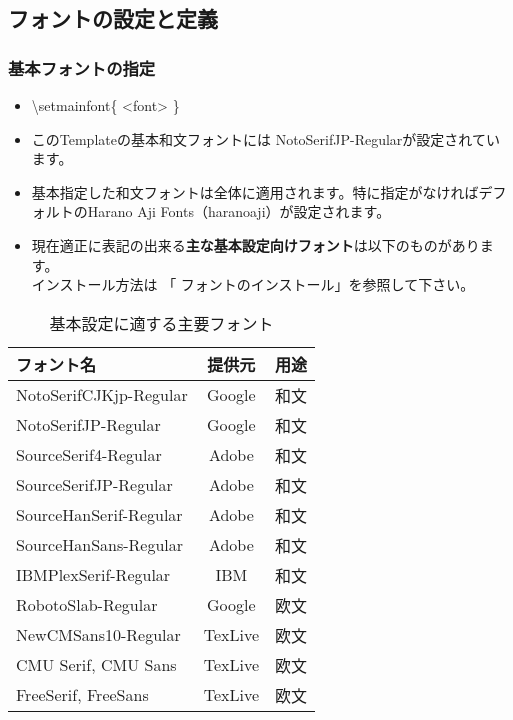 \documentclass[a4paper,10pt]{ltjsarticle}
\def\colH#1{\color[HTML]{#1}}
\def\bs{\textbackslash }
\begin{document}
\subsection{フォントの設定と定義}

\subsubsection{基本フォントの指定}
\begin{itemize}
  \item[]\hspace{-5mm} {\colH{800000}\bs setmainfont\{ <font> \}}
  \item このTemplateの基本和文フォントには{\colH{800000} NotoSerifJP-Regular}が設定されています。
  \item 基本指定した和文フォントは全体に適用されます。特に指定がなければデフォルトのHarano Aji Fonts（haranoaji）が設定されます。
  \item 現在適正に表記の出来る\textbf{主な基本設定向けフォント}は以下のものがあります。\\
  インストール方法は 「{\fFSans{} フォントのインストール}」を参照して下さい。\vspace{-4mm}
\end{itemize}
\begin{table}[h]
\begin{center}
\begin{tabular}{l|c|l}
\textbf{フォント名} & \textbf{提供元} & \textbf{用途}\\
\hline
NotoSerifCJKjp-Regular & Google & 和文\\%
NotoSerifJP-Regular & Google & 和文\\%
SourceSerif4-Regular & Adobe & 和文\\%
SourceSerifJP-Regular & Adobe & 和文\\%
SourceHanSerif-Regular & Adobe & 和文\\%
SourceHanSans-Regular & Adobe & 和文\\%
IBMPlexSerif-Regular & IBM & 和文\\%
RobotoSlab-Regular & Google & 欧文\\%
NewCMSans10-Regular & TexLive & 欧文\\%
CMU Serif, CMU Sans & TexLive & 欧文\\%
FreeSerif, FreeSans & TexLive & 欧文\\%
\end{tabular}
\caption{基本設定に適する主要フォント}
\end{center}
\end{table}
\vspace{-10mm}
\end{document}
